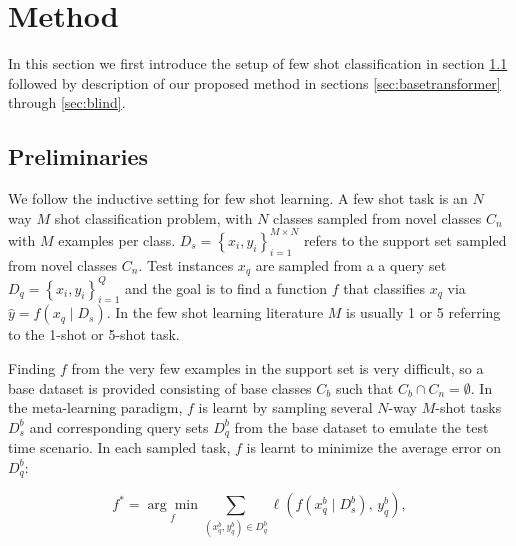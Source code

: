 \documentclass{bmvc2k}
\begin{document}
\section{Method}
In this section we first introduce the setup of few shot classification in section \ref{sec:preliminaries} followed by description of our proposed method in sections \ref{sec:basetransformer} through \ref{sec:blind}.

\subsection{Preliminaries} \label{sec:preliminaries}
We follow the inductive setting for few shot learning. A few shot task is an $N$ way $M$ shot classification problem, with $N$ classes sampled from novel classes \( C_{n} \) with $M$ examples per class. \begin{math}D_\mathit{s} = \left \{x_i, y_i \right \}_{i=1}^{M\times N}\end{math} refers to the support set sampled from novel classes \( C_{n} \).
Test instances \(x_\mathit{q}\) are sampled from a a query set \(D_\mathit{q} = \left \{x_i, y_i \right \}_{i=1}^{Q}\) and the goal is to find a function $f$ that classifies  \begin{math}x_\mathit{q}\end{math} via \begin{math}\hat y = f\left ( x_{q}\mid D_\mathit{s} \right )\end{math}. In the few shot learning literature $M$ is usually 1 or 5 referring to the 1-shot or 5-shot task.

Finding $f$ from the very few examples in the support set is very difficult, so a base dataset is provided consisting of base classes \(C_b\) such that \begin{math}C_{b}\cap C_{n}=\emptyset \end{math}. In the meta-learning paradigm, $f$ is learnt by sampling several $N$-way $M$-shot tasks \(D_\mathit{s}^\mathit{b}\) and corresponding query sets \(D_\mathit{q}^\mathit{b}\) from the base dataset to emulate the test time scenario. In each sampled task, $f$ is learnt to  minimize the average error on \(D_\mathit{q}^\mathit{b}\):



\begin{equation}
f^{*}=\underset{f}{\arg\min} \sum_{(x_\mathit{q}^\mathit{b}, y_\mathit{q}^\mathit{b})\in D_\mathit{q}^\mathit{b}}^{} \ell\left(f(x_\mathit{q}^\mathit{b}\mid D_\mathit{s}^\mathit{b}),\, y_\mathit{q}^\mathit{b}\right),
\end{equation}
\end{document}

